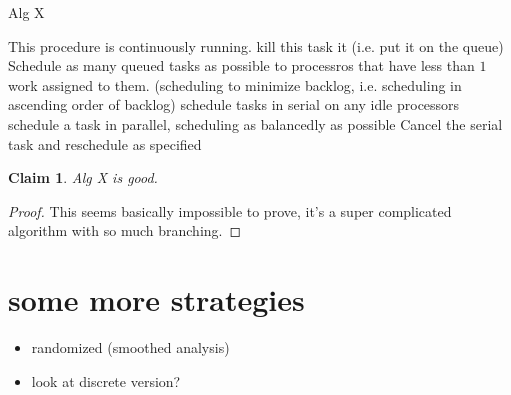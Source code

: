 \documentclass{article}[11pt]
\newtheorem{claim}{Claim}
\begin{document}
\begin{algorithm}
  \caption{Alg X}
  \label{alg:nonharmfultermination}
  \begin{algorithmic}[1]
    \State This procedure is continuously running.
          \State kill this task it (i.e. put it on the queue)
        \EndIf
      \EndFor
      \State Schedule as many queued tasks as possible to
      processros that have less than $1$ work assigned to them.
      (scheduling to minimize backlog, i.e. scheduling in
      ascending order of backlog)
    \EndIf
          \State schedule tasks in serial on any idle processors
        \EndIf
          \State schedule a task in parallel, scheduling as
          balancedly as possible
        \EndIf
      \EndIf
        \State Cancel the serial task and reschedule as specified
      \EndIf
    \EndIf
    \EndProcedure
  \end{algorithmic}
\end{algorithm}

\begin{claim}
  Alg X is good.
\end{claim}
\begin{proof}
  This seems basically impossible to prove, it's a super
  complicated algorithm with so much branching. 
\end{proof}

\section{some more strategies}

\begin{itemize}
  \item randomized (smoothed analysis)
  \item look at discrete version?
\end{itemize}
\end{document}
